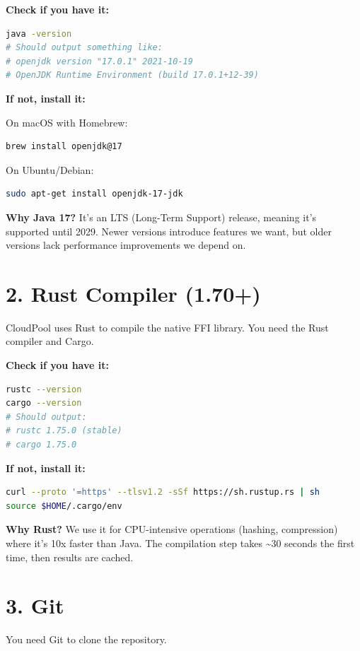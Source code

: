 \documentclass[11pt,a4paper]{report}
\begin{document}
\textbf{Check if you have it:}
\begin{lstlisting}[language=bash]
java -version
# Should output something like:
# openjdk version "17.0.1" 2021-10-19
# OpenJDK Runtime Environment (build 17.0.1+12-39)
\end{lstlisting}

\textbf{If not, install it:}

On macOS with Homebrew:
\begin{lstlisting}[language=bash]
brew install openjdk@17
\end{lstlisting}

On Ubuntu/Debian:
\begin{lstlisting}[language=bash]
sudo apt-get install openjdk-17-jdk
\end{lstlisting}

\textbf{Why Java 17?} It's an LTS (Long-Term Support) release, meaning it's supported until 2029. Newer versions introduce features we want, but older versions lack performance improvements we depend on.


\section{2. Rust Compiler (1.70+)}


CloudPool uses Rust to compile the native FFI library. You need the Rust compiler and Cargo.

\textbf{Check if you have it:}
\begin{lstlisting}[language=bash]
rustc --version
cargo --version
# Should output:
# rustc 1.75.0 (stable)
# cargo 1.75.0
\end{lstlisting}

\textbf{If not, install it:}
\begin{lstlisting}[language=bash]
curl --proto '=https' --tlsv1.2 -sSf https://sh.rustup.rs | sh
source $HOME/.cargo/env
\end{lstlisting}

\textbf{Why Rust?} We use it for CPU-intensive operations (hashing, compression) where it's 10x faster than Java. The compilation step takes {\textasciitilde}30 seconds the first time, then results are cached.


\section{3. Git}


You need Git to clone the repository.
\end{document}
